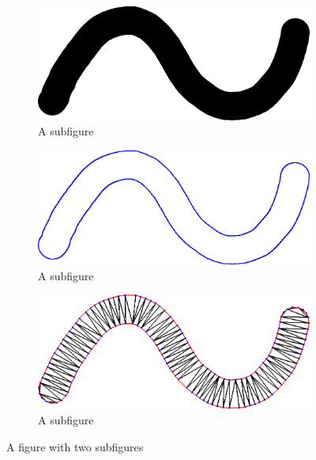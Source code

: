 \documentclass[conference]{acmsiggraph}
\begin{document}
\begin{figure}
\centering
\begin{subfigure}[b]{0.3\textwidth}
  \centering
  \includegraphics[width=.9\textwidth]{images/stroke_triangulation/hardrendered}
  \caption{A subfigure}
  \label{fig:sub1}
\end{subfigure}%
\begin{subfigure}[b]{0.3\textwidth}
  \centering
  \includegraphics[width=.9\textwidth]{images/stroke_triangulation/hardpruned}
  \caption{A subfigure}
  \label{fig:sub2}
\end{subfigure}
\begin{subfigure}[b]{0.3\textwidth}
  \centering
  \includegraphics[width=.9\textwidth]{images/stroke_triangulation/hardmesh}
  \caption{A subfigure}
  \label{fig:sub2}
\end{subfigure}
\caption{A figure with two subfigures}
\label{fig:test}
\end{figure}
\end{document}
